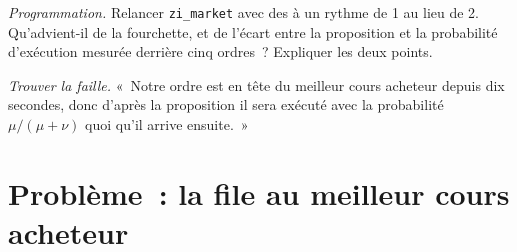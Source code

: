\begin{exercise}[$\star\star\star$]\label{exo:mx:the-limit-order-book:7}
\emph{Programmation.} Relancer \texttt{zi\_market} avec des  à un rythme de 1 au lieu de 2. Qu'advient-il de la fourchette, et de l'écart entre la
proposition et la probabilité d'exécution mesurée derrière cinq ordres~? Expliquer les deux points.
\end{exercise}

\begin{exercise}[$\star\star\star$]\label{exo:mx:the-limit-order-book:8}
\emph{Trouver la faille.} «~Notre ordre est en tête du meilleur cours acheteur depuis dix secondes, donc d'après la proposition il sera exécuté avec la probabilité
$\mu/(\mu+\nu)$ quoi qu'il arrive ensuite.~»
\end{exercise}

\section{Problème~: la file au meilleur cours acheteur}

